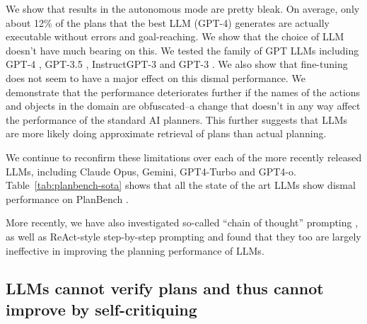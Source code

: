 \documentclass{article}
\newcommand{\bnote}[1]{\color{black}#1\color{black}}
\theoremstyle{plain}
\theoremstyle{definition}
\theoremstyle{remark}
\begin{document}
We show that results in the autonomous mode are pretty bleak. On
average, only about 12\% of the plans that the best LLM (GPT-4)
generates are actually executable without errors and 
goal-reaching. We show that the choice of LLM doesn't have much
bearing on this. We tested the
family of GPT LLMs including GPT-4 \cite{openai2023gpt4}, GPT-3.5
\cite{openai_chatgpt}, InstructGPT-3 \cite{ouyang2022training} and GPT-3
\cite{brown2020language}.
We also show that fine-tuning does not seem to have a major effect on this dismal performance. 
%
We demonstrate that the performance deteriorates further if the names of the actions and objects in the domain are obfuscated--a change that doesn't in any way affect the performance of the standard AI planners. This further suggests that LLMs are more likely doing approximate retrieval of plans than actual planning. 
%
%

\bnote{We continue to reconfirm these limitations over each of the more
recently released LLMs, including Claude Opus, Gemini, GPT4-Turbo and
GPT4-o. Table~\ref{tab:planbench-sota} shows that all the
state of the art LLMs show dismal performance on PlanBench
\cite{valmeekam2023planbench}.}

\bnote{More recently, we have also investigated
so-called ``chain of thought'' prompting \cite{stechly2024chain}, as well as ReAct-style step-by-step prompting \cite{mudit-siddhant-react} and found that they too are largely
ineffective in improving the planning performance of 
LLMs.}



\subsection{LLMs cannot verify plans and thus cannot improve by self-critiquing }
\label{sec:cantverify}
\end{document}
